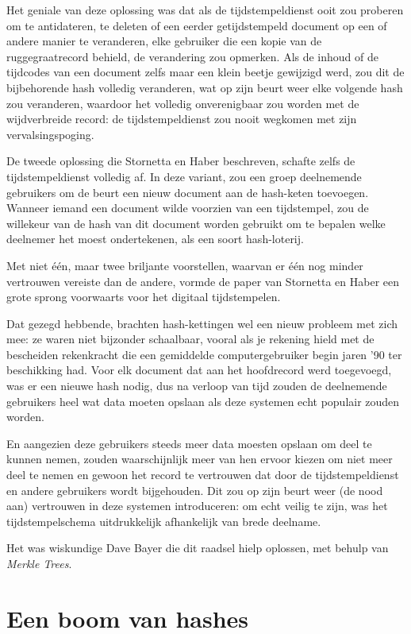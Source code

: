\documentclass[smalldemyvopaper,11pt,twoside,onecolumn,openright,extrafontsizes,hidelinks]{memoir}
\begin{document}
Het geniale van deze oplossing was dat als de tijdstempeldienst ooit zou
proberen om te antidateren, te deleten of een eerder getijdstempeld
document op een of andere manier te veranderen, elke gebruiker die een
kopie van de ruggegraatrecord behield, de verandering zou opmerken. Als
de inhoud of de tijdcodes van een document zelfs maar een klein beetje
gewijzigd werd, zou dit de bijbehorende hash volledig veranderen, wat op
zijn beurt weer elke volgende hash zou veranderen, waardoor het volledig
onverenigbaar zou worden met de wijdverbreide record: de
tijdstempeldienst zou nooit wegkomen met zijn vervalsingspoging.

De tweede oplossing die Stornetta en Haber beschreven, schafte zelfs de
tijdstempeldienst volledig af. In deze variant, zou een groep
deelnemende gebruikers om de beurt een nieuw document aan de hash-keten
toevoegen. Wanneer iemand een document wilde voorzien van een
tijdstempel, zou de willekeur van de hash van dit document worden
gebruikt om te bepalen welke deelnemer het moest ondertekenen, als een
soort hash-loterij.

Met niet één, maar twee briljante voorstellen, waarvan er één nog minder
vertrouwen vereiste dan de andere, vormde de paper van Stornetta en
Haber een grote sprong voorwaarts voor het digitaal tijdstempelen.

Dat gezegd hebbende, brachten hash-kettingen wel een nieuw probleem met
zich mee: ze waren niet bijzonder schaalbaar, vooral als je rekening
hield met de bescheiden rekenkracht die een gemiddelde computergebruiker
begin jaren '90 ter beschikking had. Voor elk document dat aan het
hoofdrecord werd toegevoegd, was er een nieuwe hash nodig, dus na
verloop van tijd zouden de deelnemende gebruikers heel wat data moeten
opslaan als deze systemen echt populair zouden worden.

En aangezien deze gebruikers steeds meer data moesten opslaan om deel te
kunnen nemen, zouden waarschijnlijk meer van hen ervoor kiezen om niet
meer deel te nemen en gewoon het record te vertrouwen dat door de
tijdstempeldienst en andere gebruikers wordt bijgehouden. Dit zou op
zijn beurt weer (de nood aan) vertrouwen in deze systemen introduceren:
om echt veilig te zijn, was het tijdstempelschema uitdrukkelijk
afhankelijk van brede deelname.

Het was wiskundige Dave Bayer die dit raadsel hielp oplossen, met behulp
van \emph{Merkle Trees}.

\section{Een boom van hashes}\label{een-boom-van-hashes}
\end{document}
